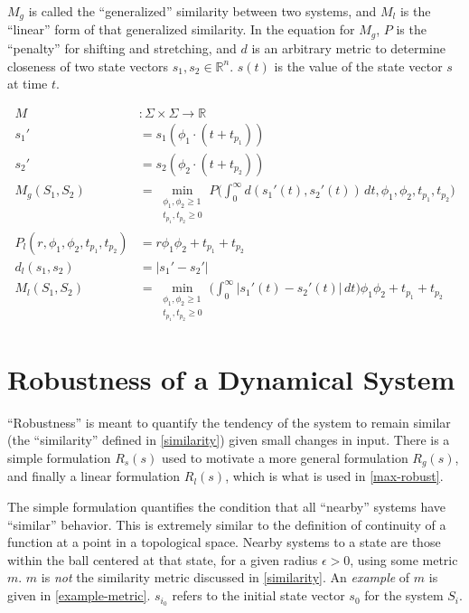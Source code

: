 \documentclass{article}
\begin{document}
$M_g$ is called the ``generalized'' similarity between two systems, and $M_l$ is the ``linear'' form of that generalized similarity. In the equation for $M_g$, $P$ is the ``penalty'' for shifting and stretching, and $d$ is an arbitrary metric to determine closeness of two state vectors $s_1, s_2 \in \mathbb{R}^n$. $s(t)$ is the value of the state vector $s$ at time $t$.

\begin{align}
  M &: \Sigma \times \Sigma \to \mathbb{R} \\
  s_1' &= s_1(\phi_1 \cdot (t + t_{p_1})) \\
  s_2' &= s_2(\phi_2 \cdot (t + t_{p_2})) \\
  M_g(S_1, S_2) &= \min_{\substack{\phi_1, \phi_2 \ge 1 \\ t_{p_1}, t_{p_2} \ge 0}} P\bigg(\int_0^\infty d(s_1'(t), s_2'(t)) \,dt, \phi_1, \phi_2, t_{p_1}, t_{p_2}\bigg) \\
  P_l(r, \phi_1, \phi_2, t_{p_1}, t_{p_2}) &= r \phi_1 \phi_2 + t_{p_1} + t_{p_2} \\
  d_l(s_1, s_2) &= \lvert s_1' - s_2' \rvert \\
  M_l(S_1, S_2) &= \min_{\substack{\phi_1, \phi_2 \ge 1 \\ t_{p_1}, t_{p_2} \ge 0}} \bigg(\int_0^\infty \lvert s_1'(t) - s_2'(t) \rvert \,dt\bigg) \phi_1 \phi_2 + t_{p_1} + t_{p_2} \label{linear-similarity}
\end{align}

\section{Robustness of a Dynamical System}
``Robustness'' is meant to quantify the tendency of the system to remain similar (the ``similarity'' defined in \ref{similarity}) given small changes in input. There is a simple formulation $R_s(s)$ used to motivate a more general formulation $R_g(s)$, and finally a linear formulation $R_l(s)$, which is what is used in \ref{max-robust}.

The simple formulation quantifies the condition that all ``nearby'' systems have ``similar'' behavior. This is extremely similar to the definition of continuity of a function at a point in a topological space. Nearby systems to a state are those within the ball centered at that state, for a given radius $\epsilon > 0$, using some metric $m$. $m$ is \textit{not} the similarity metric discussed in \ref{similarity}. An \textit{example} of $m$ is given in \eqref{example-metric}. $s_{i_0}$ refers to the initial state vector $s_0$ for the system $S_i$.
\end{document}

